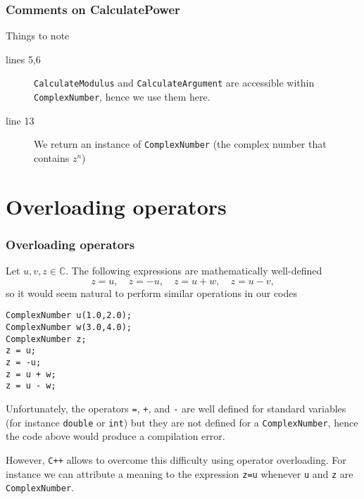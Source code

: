 \documentclass[8pt, compress]{beamer}
\def\inline{\lstinline[basicstyle=\ttfamily,keywordstyle={},directivestyle={}]}
\begin{document}
\begin{frame}[fragile]
  \frametitle{Comments on CalculatePower}

   

  \begin{alertblock}{Things to note}
    \begin{description}
      \item[lines 5,6] \inline|CalculateModulus| and \inline|CalculateArgument|
	are accessible within \inline|ComplexNumber|, hence we use them here.

      \item[line 13] We return an instance of \inline|ComplexNumber| (the
	complex number that contains $z^n$)
    \end{description}
  \end{alertblock}
\end{frame}

\section{Overloading operators}
\begin{frame}[fragile]
  \frametitle{Overloading operators}
  Let $u,v,z \in \mathbb{C}$. The following expressions are mathematically well-defined
  \[
    z = u, \quad z = -u, \quad z = u + w, \quad z = u - v,
  \]
  so it would seem natural to perform similar operations in our codes
  \begin{lstlisting}[numbers=none]
ComplexNumber u(1.0,2.0);
ComplexNumber w(3.0,4.0);
ComplexNumber z;
z = u; 
z = -u; 
z = u + w;
z = u - w;
  \end{lstlisting}

  Unfortunately, the operators \inline|=|, \inline|+|, and \inline|-| are well
  defined for standard variables (for instance \inline|double| or \inline|int|) but
  they are not defined for a \inline|ComplexNumber|, hence the code above would
  produce a compilation error.

  However, \inline|C++| allows to overcome this difficulty using \alert{operator
  overloading}. For instance we can attribute a meaning to the expression
  \inline|z=u| whenever \inline|u| and \inline|z| are \inline|ComplexNumber|.
\end{frame}
\end{document}
